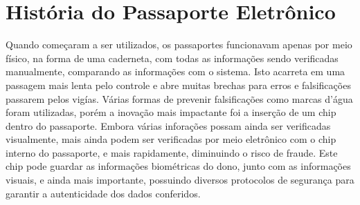 \documentclass{article}
\begin{document}
	\section{História do Passaporte Eletrônico}
		\begin{flushleft}
			
\hspace{2cm}Quando começaram a ser utilizados, os passaportes funcionavam apenas por meio físico, na forma de uma caderneta, com todas as informações sendo verificadas manualmente, comparando as informações com o sistema. Isto acarreta em uma passagem mais lenta pelo controle e abre muitas brechas para erros e falsificações passarem pelos vigías. Várias formas de prevenir falsificações como marcas d’água foram utilizadas, porém a inovação mais impactante foi a inserção de um chip dentro do passaporte. Embora várias inforações possam ainda ser verificadas visualmente, mais ainda podem ser verificadas por meio eletrônico com o chip interno do passaporte, e mais rapidamente, diminuindo o risco de fraude. Este chip pode guardar as informações biométricas do dono, junto com as informações visuais, e ainda mais importante, possuindo diversos protocolos de segurança para garantir a autenticidade dos dados conferidos.
			
		\end{flushleft}
\end{document}
